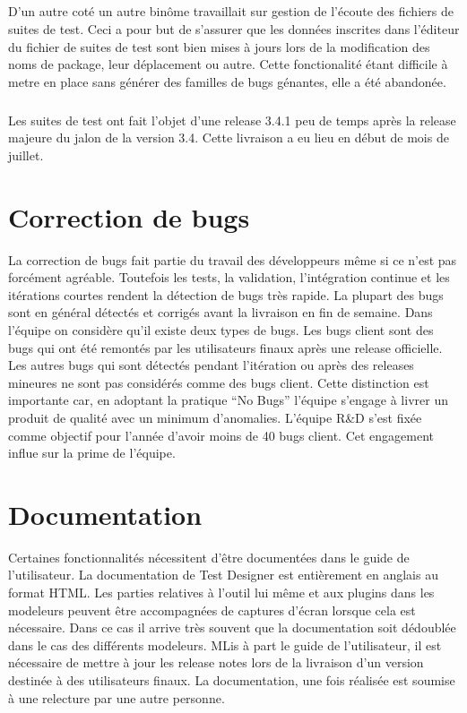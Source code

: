\subparagraph*{}
D'un autre coté un autre binôme travaillait sur gestion de l'écoute des fichiers de suites de test. Ceci a pour but de s'assurer que les données inscrites dans l'éditeur du fichier de suites de test sont bien mises à jours lors de la modification des noms de package, leur déplacement ou autre. Cette fonctionalité étant difficile à metre en place sans générer des familles de bugs génantes, elle a été abandonée.

\subparagraph*{}
Les suites de test ont fait l'objet d'une release 3.4.1 peu de temps après la release majeure du jalon de la version 3.4. Cette livraison a eu lieu en début de mois de juillet.

\section{Correction de bugs}
La correction de bugs fait partie du travail des développeurs même si ce n'est pas forcément agréable. Toutefois les tests, la validation, l'intégration continue et les itérations courtes rendent la détection de bugs très rapide. La plupart des bugs sont en général détectés et corrigés avant la livraison en fin de semaine. Dans l'équipe on considère qu'il existe deux types de bugs. Les bugs client sont des bugs qui ont été remontés par les utilisateurs finaux après une release officielle. Les autres bugs qui sont détectés pendant l'itération ou après des releases mineures ne sont pas considérés comme des bugs client. Cette distinction est importante car, en adoptant la pratique ``No Bugs'' l'équipe s'engage à livrer un produit de qualité avec un minimum d'anomalies. L'équipe R\&D s'est fixée comme objectif pour l'année d'avoir moins de 40 bugs client. Cet engagement influe sur la prime de l'équipe.

\section{Documentation}
Certaines fonctionnalités nécessitent d'être documentées dans le guide de l'utilisateur. La documentation de Test Designer est entièrement en anglais au format HTML. Les parties relatives à l'outil lui même et aux plugins dans les modeleurs peuvent être accompagnées de captures d'écran lorsque cela est nécessaire. Dans ce cas il arrive très souvent que la documentation soit dédoublée dans le cas des différents modeleurs. MLis à part le guide de l'utilisateur, il est nécessaire de mettre à jour les release notes lors de la livraison d'un version destinée à des utilisateurs finaux. La documentation, une fois réalisée est soumise à une relecture par une autre personne.

